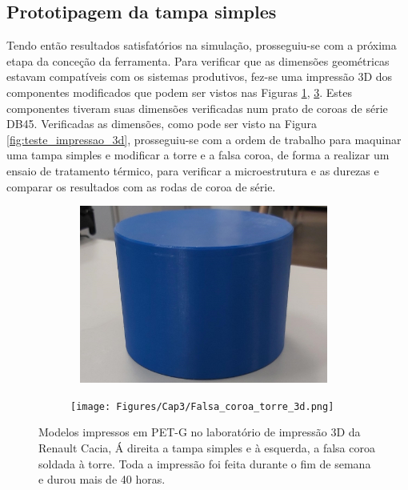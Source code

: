 \subsection{Prototipagem da tampa simples}  \label{ssec:materiais_prototipagem_simples}
Tendo então resultados satisfatórios na simulação, prosseguiu-se com a próxima etapa da conceção da ferramenta. Para verificar que as dimensões geométricas estavam compatíveis com os sistemas produtivos, fez-se uma impressão 3D dos componentes modificados que podem ser vistos nas Figuras \ref{fig:Tampa_simples_3d}, \ref{fig:falsa_coroa_torre_3d}. Estes componentes tiveram suas dimensões verificadas num prato de coroas de série DB45. Verificadas as dimensões, como pode ser visto na Figura \ref{fig:teste_impressao_3d}, prosseguiu-se com a ordem de trabalho para maquinar uma tampa simples e modificar a torre e a falsa coroa, de forma a realizar um ensaio de tratamento térmico, para verificar a microestrutura e as durezas e comparar os resultados com as rodas de coroa de série.
\begin{figure}[htb]
    \centering
    \begin{subfigure}{.5\textwidth}\
        \centering
        \includegraphics[width = 0.9\textwidth]{Figures/Cap3/tampa_simples_3d.png}
        \caption{}
        \label{fig:Tampa_simples_3d}
    \end{subfigure}%
    \begin{subfigure}{.5\textwidth}
        \centering
        \texttt{[image: Figures/Cap3/Falsa\_coroa\_torre\_3d.png]}
        \caption{}
        \label{fig:falsa_coroa_torre_3d}
    \end{subfigure}
    \caption[Modelos dos componentes modificados impressos em PET-G.]%
    {Modelos impressos em PET-G no laboratório de impressão 3D da Renault Cacia, Á direita a tampa simples e à esquerda, a falsa coroa soldada à torre. Toda a impressão foi feita durante o fim de semana e durou mais de 40 horas.}
\end{figure}
